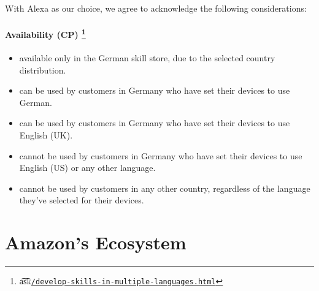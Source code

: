 





With Alexa as our choice, we agree to acknowledge the following considerations:




\subsubsection*{Availability (CP) \footnote{\t{a\t{sk}}\href{https://developer.amazon.com/docs/custom-skills/develop-skills-in-multiple-languages.html}{\lstinline|/develop-skills-in-multiple-languages.html|}}}


\begin{itemize}
	
	\item available only in the German skill store, due to the selected country distribution.
	\item can be used by customers in Germany who have set their devices to use German.
	\item can be used by customers in Germany who have set their devices to use English (UK).
	\item cannot be used by customers in Germany who have set their devices to use English (US) or any other language.
	\item cannot be used by customers in any other country, regardless of the language they've selected for their devices.
	
\end{itemize}



















\chapter{Amazon's Ecosystem}
\label{amznecosys}

%


